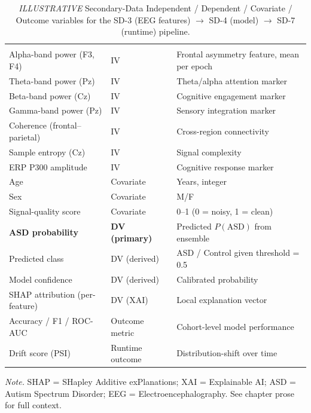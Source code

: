 {\tablestripes\tablefontsize
\begin{xltabular}{\textwidth}{@{} >{\raggedright\arraybackslash}p{3.5cm} >{\centering\arraybackslash}p{1.8cm} L @{}}
\caption[ILLUSTRATIVE Secondary-Data IV/DV Map]{\emph{ILLUSTRATIVE} Secondary-Data Independent / Dependent / Covariate / Outcome variables for the SD-3 (EEG features) $\to$ SD-4 (model) $\to$ SD-7 (runtime) pipeline.}\label{tab:ch4_secondary_iv_dv} \\
\toprule
{} &  &  \\
\midrule
\endfirsthead
\toprule
{} &  &  \\
\midrule
\endhead
\bottomrule
\endlastfoot
Alpha-band power (F3, F4) & IV & Frontal asymmetry feature, mean per epoch \\
Theta-band power (Pz) & IV & Theta/alpha attention marker \\
Beta-band power (Cz) & IV & Cognitive engagement marker \\
Gamma-band power (Pz) & IV & Sensory integration marker \\
Coherence (frontal--parietal) & IV & Cross-region connectivity \\
Sample entropy (Cz) & IV & Signal complexity \\
ERP P300 amplitude & IV & Cognitive response marker \\
Age & Covariate & Years, integer \\
Sex & Covariate & M/F \\
Signal-quality score & Covariate & 0--1 (0 = noisy, 1 = clean) \\
\textbf{ASD probability} & \textbf{DV (primary)} & Predicted $P(\text{ASD})$ from ensemble \\
Predicted class & DV (derived) & ASD / Control given threshold = 0.5 \\
Model confidence & DV (derived) & Calibrated probability \\
SHAP attribution (per-feature) & DV (XAI) & Local explanation vector \\
Accuracy / F1 / ROC-AUC & Outcome metric & Cohort-level model performance \\
Drift score (PSI) & Runtime outcome & Distribution-shift over time \\
\end{xltabular}}
\vspace{0.3em}\noindent\textit{Note.} SHAP = SHapley Additive exPlanations; XAI = Explainable AI; ASD = Autism Spectrum Disorder; EEG = Electroencephalography. See chapter prose for full context.

